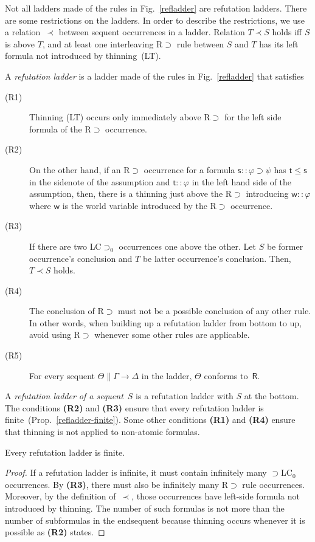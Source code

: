 \documentclass[doctor]{iscs-thesis}
\begin{document}
 Not all ladders made of the rules in Fig.~\ref{refladder} are
 refutation ladders.
 There are some restrictions on the ladders.
 In order to describe the restrictions,
 we use a relation~$\prec$ between sequent occurrences in a ladder.
Relation $T\prec S$ holds iff
 $S$ is above $T$, and
 at least one interleaving \textrm{R$\supset$} rule between $S$ and $T$
 has its left formula not introduced by thinning~(LT).
\begin{definition}
 A \textit{refutation ladder} is a ladder made of the rules in
 Fig.~\ref{refladder} that satisfies
\begin{description}
 \item[ (R1)] Thinning \textrm{(LT)} occurs only immediately above \textrm{R$\supset$} for the
	    left side formula of the \textrm{R$\supset$} occurrence.
 \item[ (R2)] 
	    On the other hand, if an \textrm{R$\supset$} occurrence
	    for a formula
	    $\mathsf s::\varphi\supset\psi$ has $\mathsf t\le \mathsf s$
	    in the sidenote of the assumption and
	    $\mathsf t::\varphi$ in the left hand side of the assumption,
	    then, 
	    there is a thinning just above the R$\supset$ introducing
	    $\mathsf w::\varphi$ where $\mathsf w$ is the world variable
	    introduced by the \textrm{R$\supset$} occurrence.
 \item[ (R3)]
	    If there are two \textrm{LC$\supset_0$} occurrences one above the
	    other.
	    Let $S$ be former occurrence's conclusion and $T$ be latter occurrence's
	    conclusion.
	    Then, $T\prec S$ holds.
 \item[ (R4)]
	    The conclusion of \textrm{R$\supset$} must not be a
	    possible conclusion of any other rule.
	    In other words, when building up a refutation ladder from
	    bottom to up, avoid using R$\supset$ whenever some other
	    rules are applicable.
 \item[ (R5)]
	    For every sequent $\Theta\parallel \Gamma\rightarrow\Delta$
	    in the ladder, $\Theta$ conforms to~$\mathsf R$.
\end{description} 
\end{definition}
A \textit{refutation ladder of a sequent}~$S$ is a refutation ladder
 with
 $S$ at the bottom.
The conditions \textbf{(R2)} and \textbf{(R3)} ensure that every
 refutation ladder is finite~(Prop.~\ref{refladder-finite}).
 Some other conditions \textbf{(R1)} and \textbf{(R4)} ensure
 that thinning is not applied to non-atomic formulas.


\begin{proposition}
\label{refladder-finite}
 Every refutation ladder is finite.
\end{proposition}
\begin{proof}
 If a refutation ladder is infinite,
 it must contain infinitely many $\supset$LC$_0$ occurrences.
 By \textbf{(R3)}, there must also be infinitely many R$\supset$ rule
 occurrences.
 Moreover, by the definition of~$\prec$,
 those occurrences have left-side formula not
 introduced by thinning.
 The number of such formulas is not more than the number of subformulas
 in the endsequent because thinning occurs whenever it is possible as
 \textbf{(R2)} states.
\end{proof}
\end{document}
